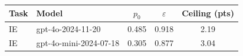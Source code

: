 \begin{tabular}{@{}ll ccc@{}}
\toprule
Task & Model & $p_0$ & $\varepsilon$ & Ceiling (pts) \\
\midrule
IE & gpt-4o-2024-11-20 & 0.485 & 0.918 & 2.19 \\
IE & gpt-4o-mini-2024-07-18 & 0.305 & 0.877 & 3.04 \\
\bottomrule
\end{tabular}

